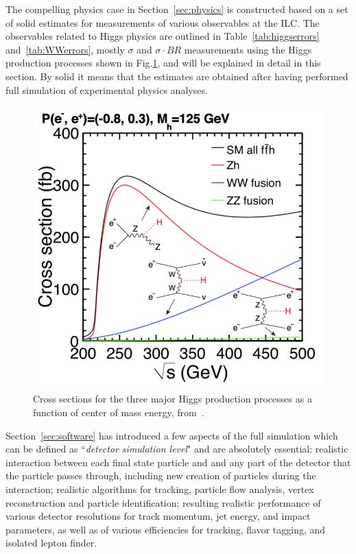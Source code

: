 The compelling physics case in Section~\ref{sec:physics} is constructed 
based on a set of solid estimates for measurements of various observables at the ILC. 
The observables related to Higgs physics are outlined in Table~\ref{tab:higgserrors} 
and~\ref{tab:WWerrors}, mostly $\sigma$ and $\sigma\cdot BR$ measurements
using the Higgs production processes shown in Fig.\ref{fig:HiggsProdILC},
 and will be explained in detail in this section. 
By solid it means that the estimates are obtained after having performed
full simulation of experimental physics analyses. 

\begin{figure}
\begin{center}
\includegraphics[width=0.85\hsize]{chapters/figures/xsec_h_ILC_left.pdf}
\end{center}
\caption{Cross sections for the three major Higgs production processes
  as a function of 
center of mass energy, 
from~\cite{Baer:2013cma}.}
\label{fig:HiggsProdILC}
\end{figure}

Section~\ref{sec:software} has introduced a few aspects of the full simulation
which can be defined as ``{\it detector simulation level}" and are absolutely essential: 
realistic interaction between each final state particle and 
and any part of the detector that the particle passes through, including new creation of
particles during the interaction; realistic algorithms for tracking,
particle flow analysis, vertex reconstruction and particle identification; 
resulting realistic performance of various detector resolutions for track momentum, jet energy,
and impact parameters, as well as of various efficiencies for tracking, flavor tagging, 
and isolated lepton finder. 

